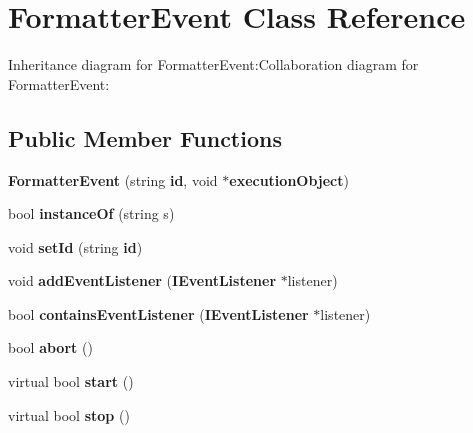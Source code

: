 \section{FormatterEvent Class Reference}
\label{classbr_1_1pucrio_1_1telemidia_1_1ginga_1_1ncl_1_1model_1_1event_1_1FormatterEvent}
Inheritance diagram for FormatterEvent:Collaboration diagram for FormatterEvent:\subsection*{Public Member Functions}
\begin{CompactItemize}
\item 
\textbf{FormatterEvent} (string {\bf id}, void $\ast${\bf executionObject})\label{classbr_1_1pucrio_1_1telemidia_1_1ginga_1_1ncl_1_1model_1_1event_1_1FormatterEvent_eecea63eb7f461691c4f3832d7f8429c}

\item 
bool \textbf{instanceOf} (string s)\label{classbr_1_1pucrio_1_1telemidia_1_1ginga_1_1ncl_1_1model_1_1event_1_1FormatterEvent_4081cb1ebb5adebc1d0858ff6f69af0d}

\item 
void \textbf{setId} (string {\bf id})\label{classbr_1_1pucrio_1_1telemidia_1_1ginga_1_1ncl_1_1model_1_1event_1_1FormatterEvent_09363425ca175437f0ec328d404ab88a}

\item 
void \textbf{addEventListener} ({\bf IEventListener} $\ast$listener)\label{classbr_1_1pucrio_1_1telemidia_1_1ginga_1_1ncl_1_1model_1_1event_1_1FormatterEvent_ff069276e25b26bec6601c7a603229ef}

\item 
bool \textbf{containsEventListener} ({\bf IEventListener} $\ast$listener)\label{classbr_1_1pucrio_1_1telemidia_1_1ginga_1_1ncl_1_1model_1_1event_1_1FormatterEvent_9644852763f674732ef20efeba97509d}

\item 
bool \textbf{abort} ()\label{classbr_1_1pucrio_1_1telemidia_1_1ginga_1_1ncl_1_1model_1_1event_1_1FormatterEvent_e75017b64297bc5a74260a768fb86cf1}

\item 
virtual bool \textbf{start} ()\label{classbr_1_1pucrio_1_1telemidia_1_1ginga_1_1ncl_1_1model_1_1event_1_1FormatterEvent_2a1dbe283ac44900c920f3f79339f9f6}

\item 
virtual bool \textbf{stop} ()\label{classbr_1_1pucrio_1_1telemidia_1_1ginga_1_1ncl_1_1model_1_1event_1_1FormatterEvent_3d0f1501fa4ccfb9e3f868ab4a185856}


\end{CompactItemize}
